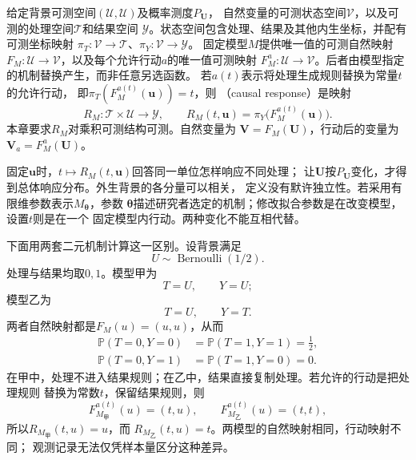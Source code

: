 \begin{definition}
  \label{def:causal-response-interface}
  给定背景可测空间\((\mathcal U,\mathscr U)\)及概率测度\(P_{\bm U}\)，
  自然变量的可测状态空间\(\mathcal V\)，以及可测的处理空间\(\mathcal T\)和结果空间
  \(\mathcal Y\)。状态空间包含处理、结果及其他内生坐标，并配有可测坐标映射
  \(\pi_T:\mathcal V\to\mathcal T\)、\(\pi_Y:\mathcal V\to\mathcal Y\)。
  固定模型\(M\)提供唯一值的可测自然映射
  \(F_M:\mathcal U\to\mathcal V\)，以及每个允许行动\(a\)的唯一值可测映射
  \(F_M^a:\mathcal U\to\mathcal V\)。后者由模型指定的机制替换产生，而非任意另选函数。
  若\(a(t)\)表示将处理生成规则替换为常量\(t\)的允许行动，
  即\(\pi_T(F_M^{a(t)}(\bm u))=t\)，则
  （causal response）是映射
  \begin{equation}
    R_M:\mathcal T\times\mathcal U\longrightarrow\mathcal Y,
    \qquad
    R_M(t,\bm u)=\pi_Y\bigl(F_M^{a(t)}(\bm u)\bigr).
    \label{eq:causal-response-interface}
  \end{equation}
  本章要求\(R_M\)对乘积可测结构可测。自然变量为
  \(\bm V=F_M(\bm U)\)，行动后的变量为\(\bm V_a=F_M^a(\bm U)\)。
\end{definition}

固定\(\bm u\)时，\(t\mapsto R_M(t,\bm u)\)回答同一单位怎样响应不同处理；
让\(\bm U\)按\(P_{\bm U}\)变化，才得到总体响应分布。外生背景的各分量可以相关，
定义没有默许独立性。若采用有限维参数表示\(M_{\bm\theta}\)，参数
\(\bm\theta\)描述研究者选定的机制；修改拟合参数是在改变模型，设置\(t\)则是在一个
固定模型内行动。两种变化不能互相代替。

下面用两套二元机制计算这一区别。设背景满足
\[
  U\sim\operatorname{Bernoulli}(1/2).
\]
处理与结果均取\(0,1\)。模型甲为
\begin{equation}
  T=U,\qquad Y=U;
  \label{eq:causal-observational-equivalence-confounding}
\end{equation}
模型乙为
\begin{equation}
  T=U,\qquad Y=T.
  \label{eq:causal-observational-equivalence-effect}
\end{equation}
两者自然映射都是\(F_M(u)=(u,u)\)，从而
\[
  \begin{aligned}
    \mathbb P(T=0,Y=0)&=\mathbb P(T=1,Y=1)=\frac12,\\
    \mathbb P(T=0,Y=1)&=\mathbb P(T=1,Y=0)=0.
  \end{aligned}
\]
在甲中，处理不进入结果规则；在乙中，结果直接复制处理。若允许的行动是把处理规则
替换为常数\(t\)，保留结果规则，则
\[
  F_{M_{\text{甲}}}^{a(t)}(u)=(t,u),\qquad
  F_{M_{\text{乙}}}^{a(t)}(u)=(t,t),
\]
所以\(R_{M_{\text{甲}}}(t,u)=u\)，而
\(R_{M_{\text{乙}}}(t,u)=t\)。两模型的自然映射相同，行动映射不同；
观测记录无法仅凭样本量区分这种差异。

